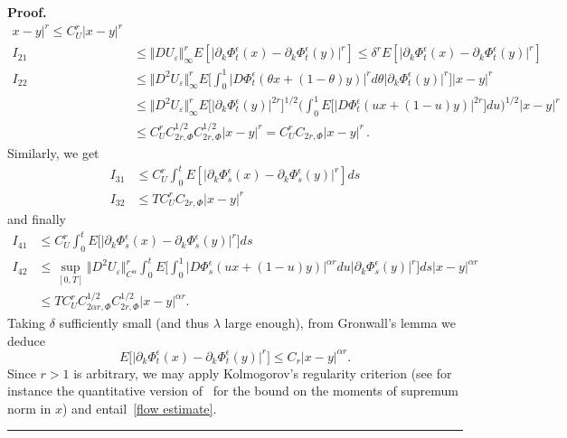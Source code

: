 \documentclass[a4paper,10pt]{article}
\newenvironment{proof}[1][Proof]{\noindent\textbf{#1.} }{\ \rule{0.5em}{0.5em}}
\begin{document}
\begin{proof}
\begin{align*}
x-y\vert ^{r}\leq C_{U}^{r}\vert x-y\vert ^{r} \\[0.1cm]
I_{21} & \leq\Vert DU_{\varepsilon}\Vert _{\infty}^{r}E[
\vert \partial_{k}\Phi^{\epsilon}_{t}(x)  -\partial
_{k}\Phi^{\epsilon}_{t}(  y)  \vert ^{r}]  \leq
\delta^{r}E[  \vert \partial_{k}\Phi^{\epsilon}_{t}(
x)  -\partial_{k}\Phi^{\epsilon}_{t}(  y)  \vert
^{r}] \\
I_{22} & \leq\Vert D^{2}U_{\varepsilon}\Vert _{\infty}^{r}E \Big[
\int_{0}^{1}\vert D\Phi^{\epsilon}_{t}(  \theta x+(  1-\theta)
y)  \vert ^{r}d\theta\vert \partial_{k}\Phi^{\epsilon}_{t}(
y)  \vert ^{r}\Big]  \vert x-y\vert ^{r}\\
& \leq\Vert D^{2}U_{\varepsilon}\Vert _{\infty}^{r}E \Big[
\vert \partial_{k}\Phi^{\epsilon}_{t}(  y)  \vert
^{2r}\Big]  ^{1/2} \Big(  \int_{0}^{1}E \big[ \vert D\Phi
^{\epsilon}_{t}(  ux+(  1-u)  y)  \vert
^{2r} \big]  du\Big)  ^{1/2}\vert x-y\vert ^{r}\\
& \leq C_{U}^{r}C_{2r,\Phi}^{1/2}C_{2r,\Phi}^{1/2}\vert
x-y\vert ^{r}=C_{U}^{r}C_{2r,\Phi}\vert x-y\vert ^{r} \,.
\end{align*}
Similarly, we get
\begin{align*}
I_{31} & \leq C_{U}^{r}\int_{0}^{t}E[  \vert \partial_{k} 
\Phi^{\epsilon}_{s}(x)  -\partial_{k}\Phi^{\epsilon}_{s}(
y)  \vert ^{r}]  ds \\
I_{32} & \leq TC_{U}^{r}C_{2r,\Phi}\vert x-y\vert ^{r} 
\end{align*}
and finally
\begin{align*}
I_{41} & \leq C_{U}^{r}\int_{0}^{t}E \big[  \vert \partial_{k}\Phi
^{\epsilon}_{s}(x)  -\partial_{k}\Phi^{\epsilon}_{s}(
y)  \vert ^{r}\big]  ds \\
I_{42}  & \leq\sup_{[0,T]  }\Vert D^{2}U_{\varepsilon
}\Vert _{C^{\alpha}}^{r}\int_{0}^{t}E \Big[  \int_{0}^{1}\vert
D\Phi^{\epsilon}_{s}(  ux+(  1-u)  y)  \vert
^{\alpha r}du\vert \partial_{k}\Phi^{\epsilon}_{s}(  y)
\vert ^{r}\Big]  ds\vert x-y\vert ^{\alpha r}\\
& \leq TC_{U}^{r}C_{2\alpha r,\Phi}^{1/2}C_{2r,\Phi}^{1/2}\vert
x-y\vert ^{\alpha r}.
\end{align*}
Taking $\delta$ sufficiently small (and thus $\lambda$ large enough), from
Gronwall's lemma we deduce
\[
E\big[  \vert \partial_{k}\Phi^{\epsilon}_{t}(x)
-\partial_{k}\Phi^{\epsilon}_{t}(  y)  \vert ^{r}\big]
\leq C_{r}\vert x-y\vert ^{\alpha r}.
\]
Since $r>1$ is arbitrary, we may apply Kolmogorov's regularity criterion (see
for instance the quantitative version of~\cite{KUNITA84} for the bound on the
moments of supremum norm in $x$) and entail~\eqref{flow estimate}.
\end{proof}
\end{document}

